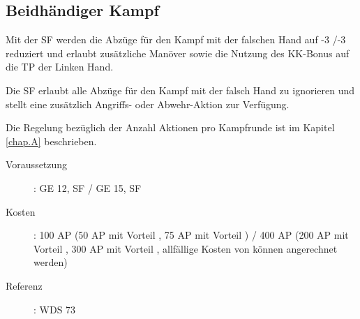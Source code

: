 \subsection{Beidhändiger Kampf}
\label{sf.beidhaendiger_kampf}
Mit der SF  werden die Abzüge für den Kampf mit der falschen Hand auf -3 /-3 reduziert und erlaubt zusätzliche Manöver sowie die Nutzung des KK-Bonus auf die TP der Linken Hand.

Die SF  erlaubt alle Abzüge für den Kampf mit der falsch Hand zu ignorieren und stellt eine zusätzlich Angriffs- oder Abwehr-Aktion zur Verfügung.

Die Regelung bezüglich der Anzahl Aktionen pro Kampfrunde ist im Kapitel \ref{chap.A} beschrieben.

\begin{description}
    \item[Voraussetzung]:
        GE 12, SF  / GE 15, SF 
    \item [Kosten]:
        100 AP (50 AP mit Vorteil , 75 AP mit Vorteil ) / 400 AP (200 AP mit Vorteil , 300 AP mit Vorteil , allfällige Kosten von  können angerechnet werden)
    \item [Referenz]:
        WDS 73
\end{description}
